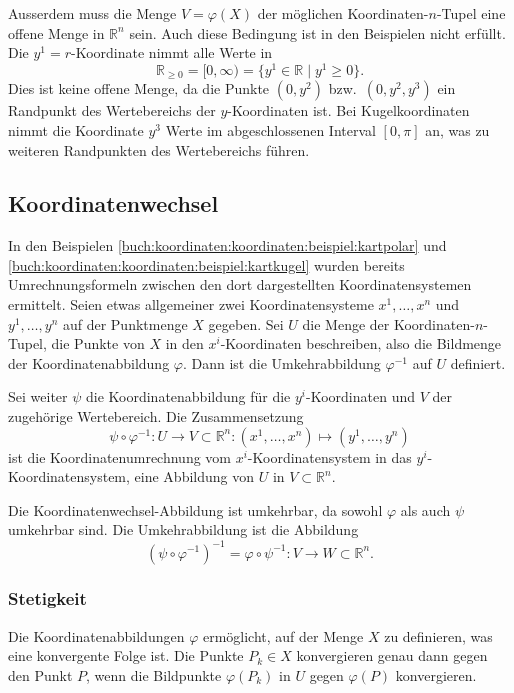 Ausserdem muss die Menge $V=\varphi(X)$ der möglichen Koordinaten-$n$-Tupel
eine offene Menge in $\mathbb{R}^n$ sein.
Auch diese Bedingung ist in den Beispielen nicht erfüllt.
Die $y^1=r$-Koordinate nimmt alle Werte in
\[
\mathbb{R}_{\ge 0}
=
[0,\infty)
=
\{
y^1\in\mathbb{R}
\mid
y^1\ge 0
\}.
\]
Dies ist keine offene Menge, da die Punkte $(0,y^2)$ bzw.~$(0,y^2,y^3)$
ein Randpunkt des Wertebereichs der $y$-Koordinaten ist.
%
%
Bei Kugelkoordinaten nimmt die Koordinate $y^3$ Werte im
abgeschlossenen Interval $[0,\pi]$ an, was zu weiteren Randpunkten
des Wertebereichs führen.


%
%
\subsection{Koordinatenwechsel
\label{buch:koordinaten:koordinaten:subsection:koordinatenwechsel}}
In den Beispielen
\ref{buch:koordinaten:koordinaten:beispiel:kartpolar}
und
\ref{buch:koordinaten:koordinaten:beispiel:kartkugel}
wurden bereits Umrechnungsformeln zwischen den dort dargestellten
Koordinatensystemen ermittelt.
Seien etwas allgemeiner zwei Koordinatensysteme $x^1,\dots,x^n$
und $y^1,\dots,y^n$ auf der Punktmenge $X$ gegeben.
Sei $U$ die Menge der Koordinaten-$n$-Tupel, die Punkte von $X$
in den $x^i$-Koordinaten beschreiben, also die Bildmenge der
Koordinatenabbildung $\varphi$.
Dann ist die Umkehrabbildung $\varphi^{-1}$ auf $U$ definiert.

Sei weiter $\psi$ die Koordinatenabbildung für die $y^i$-Koordinaten
und $V$ der zugehörige Wertebereich.
Die Zusammensetzung
\[
\psi
\circ
\varphi^{-1}
\colon
U\to V\subset\mathbb{R}^n
:
(x^1,\dots,x^n)
\mapsto
(y^1,\dots,y^n)
\]
ist die Koordinatenumrechnung vom $x^i$-Koordinatensystem in
das $y^i$-Koordinatensystem, eine Abbildung von $U$ in $V\subset\mathbb{R}^n$.


Die Koordinatenwechsel-Abbildung ist umkehrbar, da sowohl $\varphi$
als auch $\psi$ umkehrbar sind.
Die Umkehrabbildung ist die Abbildung
\[
(\psi\circ\varphi^{-1})^{-1}
=
\varphi\circ\psi^{-1}
\colon
V\to W \subset \mathbb{R}^n.
\]

%
%
\subsubsection{Stetigkeit}
Die Koordinatenabbildungen $\varphi$ ermöglicht, auf der Menge
$X$ zu definieren, was eine konvergente Folge ist.
Die Punkte $P_k\in X$ konvergieren genau dann gegen den Punkt $P$,
wenn die Bildpunkte $\varphi(P_k)$ in $U$ gegen $\varphi(P)$
konvergieren.

